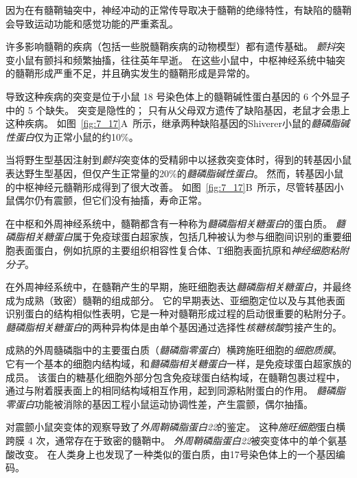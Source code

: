 \begin{proposition}[髓鞘蛋白缺陷破坏神经信号传导] \label{box:7_3}
	
	\quad \quad 因为在有髓鞘轴突中，神经冲动的正常传导取决于髓鞘的绝缘特性，有缺陷的髓鞘会导致运动功能和感觉功能的严重紊乱。
	
	\quad \quad 许多影响髓鞘的疾病（包括一些脱髓鞘疾病的动物模型）都有遗传基础。
	\textit{颤抖}突变小鼠有颤抖和频繁抽搐，往往英年早逝。
	在这些小鼠中，中枢神经系统中轴突的髓鞘形成严重不足，并且确实发生的髓鞘形成是异常的。
	
	\quad \quad 导致这种疾病的突变是位于小鼠 18 号染色体上的髓鞘碱性蛋白基因的 6 个外显子中的 5 个缺失。
	突变是隐性的；
	只有从父母双方遗传了缺陷基因，老鼠才会患上这种疾病。
	如图~\ref{fig:7_17}A~所示，继承两种缺陷基因的Shiverer小鼠的\textit{髓磷脂碱性蛋白}仅为正常小鼠的约10\%。
	
	\quad \quad 当将野生型基因注射到\textit{颤抖}突变体的受精卵中以拯救突变体时，得到的转基因小鼠表达野生型基因，但仅产生正常量的20\%的\textit{髓磷脂碱性蛋白}。
	然而，转基因小鼠的中枢神经元髓鞘形成得到了很大改善。
	如图~\ref{fig:7_17}B~所示，尽管转基因小鼠偶尔仍有震颤，但它们没有抽搐，寿命正常。
	
	\quad \quad 在中枢和外周神经系统中，髓鞘都含有一种称为\textit{髓磷脂相关糖蛋白}的蛋白质。
	\textit{髓磷脂相关糖蛋白}属于免疫球蛋白超家族，包括几种被认为参与细胞间识别的重要细胞表面蛋白，例如抗原的主要组织相容性复合体、T细胞表面抗原和\textit{神经细胞粘附分子}。
	
	\quad \quad 在外周神经系统中，在髓鞘产生的早期，施旺细胞表达\textit{髓磷脂相关糖蛋白}，并最终成为成熟（致密）髓鞘的组成部分。
	它的早期表达、亚细胞定位以及与其他表面识别蛋白的结构相似性表明，它是一种对髓鞘形成过程的启动很重要的粘附分子。
	\textit{髓磷脂相关糖蛋白}的两种异构体是由单个基因通过选择性\textit{核糖核酸}剪接产生的。
	
	\quad 成熟的外周髓磷脂中的主要蛋白质（\textit{髓磷脂零蛋白}）横跨施旺细胞的\textit{细胞质膜}。
	它有一个基本的细胞内结构域，和\textit{髓磷脂相关糖蛋白}一样，是免疫球蛋白超家族的成员。
	该蛋白的糖基化细胞外部分包含免疫球蛋白结构域，在髓鞘包裹过程中，通过与附着膜表面上的相同结构域相互作用，起到同源粘附蛋白的作用。
	\textit{髓磷脂零蛋白}功能被消除的基因工程小鼠运动协调性差，产生震颤，偶尔抽搐。
	
	\quad 对震颤小鼠突变体的观察导致了\textit{外周鞘磷脂蛋白22}的鉴定。
	这种\textit{施旺细胞}蛋白横跨膜 4 次，通常存在于致密的髓鞘中。
	\textit{外周鞘磷脂蛋白22}被突变体中的单个氨基酸改变。
	在人类身上也发现了一种类似的蛋白质，由17号染色体上的一个基因编码。
	

\end{proposition}
